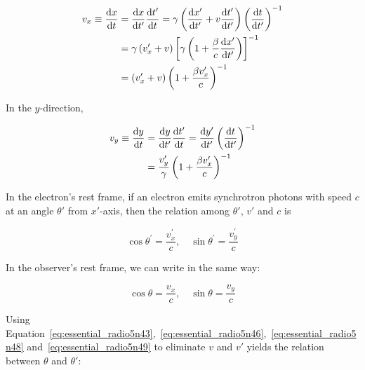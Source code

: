 \begin{equation}\label{eq:essential_radio5n43}
    \begin{aligned}
        v_x \equiv \frac{\mathrm{d} x}{\mathrm{d} t} &= \frac{\mathrm{d} x}{\mathrm{d} t^{\prime}} \frac{\mathrm{d} t^{\prime}}{\mathrm{d} t}=\gamma\left(\frac{\mathrm{d} x^{\prime}}{\mathrm{d} t^{\prime}}+v \frac{\mathrm{d} t^{\prime}}{\mathrm{d} t^{\prime}}\right)\left(\frac{\mathrm{d} t}{\mathrm{d} t^{\prime}}\right)^{-1} \\
                                       &=\gamma\left(v_x^{\prime}+v\right)\left[\gamma\left(1+\frac{\beta}{c} \frac{\mathrm{d} x^{\prime}}{\mathrm{d} t^{\prime}}\right)\right]^{-1} \\
                                       &=\left(v_x^{\prime}+v\right)\left(1+\frac{\beta v_x^{\prime}}{c}\right)^{-1}
    \end{aligned}
\end{equation}

In the $y$-direction,

\begin{equation}\label{eq:essential_radio5n46}
    \begin{aligned}
        v_y \equiv \frac{\mathrm{d} y}{\mathrm{d} t} &= \frac{\mathrm{d} y}{\mathrm{d} t^{\prime}} \frac{\mathrm{d} t^{\prime}}{\mathrm{d} t}=\frac{\mathrm{d} y^{\prime}}{\mathrm{d} t^{\prime}}\left(\frac{\mathrm{d} t}{\mathrm{d} t^{\prime}}\right)^{-1} \\
                                       &= \frac{v_y^{\prime}}{\gamma}\left(1+\frac{\beta v_x^{\prime}}{c}\right)^{-1}
    \end{aligned}
\end{equation}

In the electron's rest frame, if an electron emits synchrotron photons with speed $c$ at an angle $\theta'$ from $x'$-axis, then the relation among $\theta'$, $v'$ and $c$ is

\begin{equation}\label{eq:essential_radio5n48}
    \cos \theta^{\prime}=\frac{v_x^{\prime}}{c}, \quad \sin \theta^{\prime}=\frac{v_y^{\prime}}{c}
\end{equation}

In the observer's rest frame, we can write in the same way:

\begin{equation}\label{eq:essential_radio5n49}
    \cos \theta=\frac{v_x}{c}, \quad \sin \theta=\frac{v_y}{c}
\end{equation}

Using Equation~\ref{eq:essential_radio5n43},~\ref{eq:essential_radio5n46},~\ref{eq:essential_radio5n48} and~\ref{eq:essential_radio5n49} to eliminate $v$ and $v'$ yields the relation between $\theta$ and $\theta'$:

